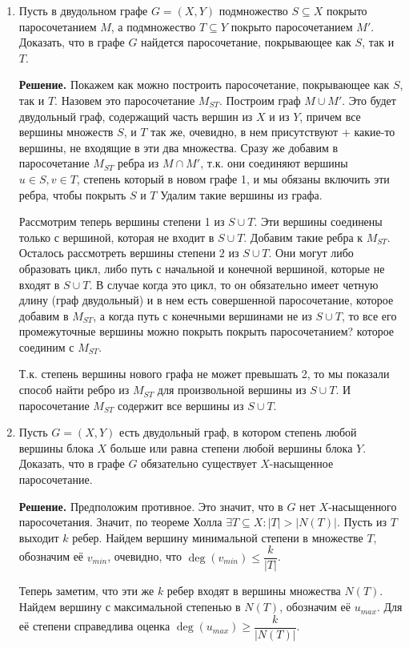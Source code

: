 \documentclass[fleqn]{article}
\begin{document}
	\begin{enumerate}
	\item Пусть в двудольном графе $G = (X, Y)$ подмножество $S \subseteq X$ покрыто паросочетанием $M$, а подмножество $T \subseteq Y$ покрыто паросочетанием $M'$. Доказать, что в графе $G$ найдется паросочетание, покрывающее как $S$, так и $T$.
	
	\textbf{Решение.} Покажем как можно построить паросочетание, покрывающее как $S$, так и $T$. Назовем это паросочетание $M_{ST}$. Построим граф $M \cup M'$. Это будет двудольный граф, содержащий часть вершин из $X$ и из $Y$, причем все вершины множеств $S$, и $T$ так же, очевидно, в нем присутствуют + какие-то вершины, не входящие в эти два множества. Сразу же добавим в паросочетание $M_{ST}$ ребра из $M\cap M'$, т.к. они соединяют вершины $u \in S, v \in T$, степень который в новом графе 1, и мы обязаны включить эти ребра, чтобы покрыть $S$ и $T$ Удалим такие вершины из графа. 
	 
	 Рассмотрим теперь вершины степени 1 из $S\cup T$. Эти вершины соединены только с вершиной, которая не входит в $S\cup T$. Добавим такие ребра к $M_{ST}$. Осталось рассмотреть вершины степени $2$ из $S\cup T$. Они могут либо образовать цикл, либо путь с начальной и конечной вершиной, которые не входят в $S\cup T$. В случае когда это цикл, то он обязательно имеет четную длину (граф двудольный) и в нем есть совершенной паросочетание, которое добавим в $M_{ST}$, а когда путь с конечными вершинами не из $S\cup T$, то все его промежуточные вершины можно покрыть покрыть паросочетанием? которое соединим с $M_{ST}$.
	 
	 Т.к. степень вершины нового графа не может превышать 2, то мы показали способ найти ребро из $M_{ST}$ для произвольной вершины из $S\cup T$. И паросочетание $M_{ST}$ содержит все вершины из  $S\cup T$.
	
	\item Пусть $G = (X, Y)$ есть двудольный граф, в котором степень любой вершины блока $X$ больше или равна степени любой вершины блока $Y$. Доказать, что в графе $G$ обязательно существует $X$-насыщенное паросочетание.
	
	\textbf{Решение.} Предположим противное. Это значит, что в $G$ нет $X$-насыщенного паросочетания. Значит, по теореме Холла $\exists T \subseteq X : |T| > |N(T)|$. Пусть из $T$ выходит $k$ ребер. Найдем вершину минимальной степени в множестве $T$, обозначим её $v_{min}$, очевидно, что $\deg(v_{min}) \leqslant \dfrac{k}{|T|}$.
	
	Теперь заметим, что эти же $k$ ребер входят в вершины множества $N(T)$. Найдем вершину с максимальной степенью в $N(T)$, обозначим её $u_{max}$. Для её степени справедлива оценка $\deg(u_{max}) \geqslant \dfrac{k}{|N(T)|}$.
	

\end{enumerate}
\end{document}
